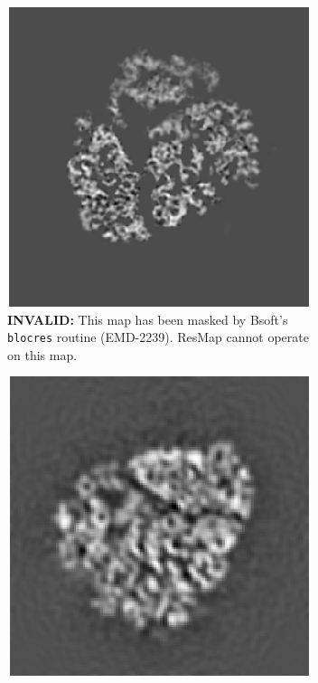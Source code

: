 \documentclass[10pt]{article}
\begin{document}
\begin{figure}[!ht]
	\centering
	\begin{subfigure}[b]{0.4\textwidth}
	        \centering
	        \includegraphics[width=\textwidth]{img/2_2239.png}
	        \caption{\textcolor{BrickRed}{\textbf{INVALID:}} This map has been masked by Bsoft's \texttt{blocres} routine (EMD-2239). ResMap cannot operate on this map.\newline}
	\end{subfigure}
	\qquad %
	\begin{subfigure}[b]{0.4\textwidth}
	        \centering
	        \includegraphics[width=\textwidth]{img/1_5562.png}

\end{subfigure}
\end{figure}
\end{document}
